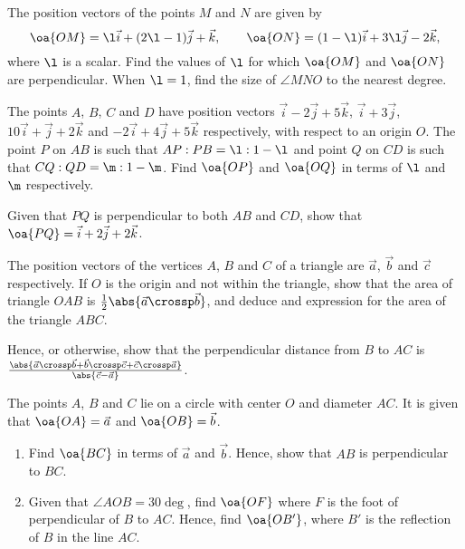 \begin{problem}
    The position vectors of the points $M$ and $N$ are given by \[\oa{OM} = \l \vec i + (2\l - 1) \vec j + \vec k, \qquad \oa{ON} = (1-\l) \vec i + 3\l \vec j - 2 \vec k,\] where $\l$ is a scalar. Find the values of $\l$ for which $\oa{OM}$ and $\oa{ON}$ are perpendicular. When $\l = 1$, find the size of $\angle MNO$ to the nearest degree.
\end{problem}

\begin{problem}
    The points $A$, $B$, $C$ and $D$ have position vectors $\vec i - 2\vec j + 5\vec k$, $\vec i + 3\vec j$, $10\vec i + \vec j + 2\vec k$ and $-2\vec i + 4\vec j + 5\vec k$ respectively, with respect to an origin $O$. The point $P$ on $AB$ is such that $AP : PB = \l : 1 - \l$ and point $Q$ on $CD$ is such that $CQ : QD = \m : 1 - \m$. Find $\oa{OP}$ and $\oa{OQ}$ in terms of $\l$ and $\m$ respectively.

    Given that $PQ$ is perpendicular to both $AB$ and $CD$, show that $\oa{PQ} = \vec i + 2\vec j + 2\vec k$.
\end{problem}

\begin{problem}
    The position vectors of the vertices $A$, $B$ and $C$ of a triangle are $\vec a$, $\vec b$ and $\vec c$ respectively. If $O$ is the origin and not within the triangle, show that the area of triangle $OAB$ is $\frac12 \abs{\vec a \crossp \vec b}$, and deduce and expression for the area of the triangle $ABC$.

    Hence, or otherwise, show that the perpendicular distance from $B$ to $AC$ is $\frac{\abs{\vec a \crossp \vec b + \vec b \crossp \vec c + \vec c \crossp \vec a}}{\abs{\vec c - \vec a}}$.
\end{problem}

\begin{problem}[\chili]
    The points $A$, $B$ and $C$ lie on a circle with center $O$ and diameter $AC$. It is given that $\oa{OA} = \vec a$ and $\oa{OB} = \vec b$.

    \begin{enumerate}
        \item Find $\oa{BC}$ in terms of $\vec a$ and $\vec b$. Hence, show that $AB$ is perpendicular to $BC$.
        \item Given that $\angle AOB = 30\deg$, find $\oa{OF}$ where $F$ is the foot of perpendicular of $B$ to $AC$. Hence, find $\oa{OB'}$, where $B'$ is the reflection of $B$ in the line $AC$.
    \end{enumerate}
\end{problem}